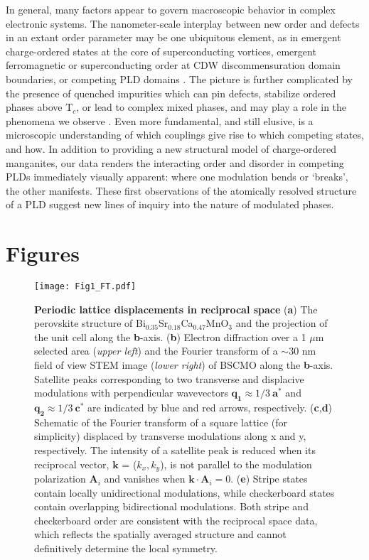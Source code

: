 \documentclass[12pt]{article}
\begin{document}
In general, many factors appear to govern macroscopic behavior in complex electronic systems.
The nanometer-scale interplay between new order and defects in an extant order parameter may be one ubiquitous element, as in emergent charge-ordered states at the core of superconducting vortices, emergent ferromagnetic or superconducting order at CDW discommensuration domain boundaries, or competing PLD domains \cite{Sipos2008,Milward2005,Hoffman2002}.
The picture is further complicated by the presence of quenched impurities which can pin defects, stabilize ordered phases above T$_c$, or lead to complex mixed phases, and may play a role in the phenomena we observe \cite{Dagotto2005,LeTacon2013,Lee1979}.
Even more fundamental, and still elusive, is a microscopic understanding of which couplings give rise to which competing states, and how.
In addition to providing a new structural model of charge-ordered manganites, our data renders the interacting order and disorder in competing PLDs immediately visually apparent: where one modulation bends or `breaks', the other manifests.
These first observations of the atomically resolved structure of a PLD suggest new lines of inquiry into the nature of modulated phases.



\clearpage
\section*{Figures}

\begin{figure}[!htb]
  \texttt{[image: Fig1\_FT.pdf]}
  \caption{\textbf{Periodic lattice displacements in reciprocal space}
(\textbf{a}) The perovskite structure of Bi$_{0.35}$Sr$_{0.18}$Ca$_{0.47}$MnO$_{3}$ and the projection of the unit cell along the \textbf{b}-axis.
(\textbf{b}) Electron diffraction over a 1 $\mu$m selected area (\textit{upper left}) and the Fourier transform of a $\sim$30 nm field of view STEM image (\textit{lower right}) of BSCMO along the \textbf{b}-axis. Satellite peaks corresponding to two transverse and displacive modulations with perpendicular wavevectors $\mathbf{q_{1}} \approx 1/3 \ \mathbf{a^{*}}$  and $\mathbf{q_{2}} \approx 1/3 \ \mathbf{c^{*}}$ are indicated by blue and red arrows, respectively.
(\textbf{c},\textbf{d}) Schematic of the Fourier transform of a square lattice (for simplicity) displaced by transverse modulations along x and y, respectively. 
The intensity of a satellite peak is reduced when its reciprocal vector, $\mathbf{k}$ = ($k_{x},k_{y}$), is not parallel to the modulation polarization $\mathbf{A}_{i}$ and vanishes when $\mathbf{k}\cdot\mathbf{A}_i=0$.
(\textbf{e})  Stripe states contain locally unidirectional modulations, while checkerboard states contain overlapping bidirectional modulations.
Both stripe and checkerboard order are consistent with the reciprocal space data, which reflects the spatially averaged structure and cannot definitively determine the local symmetry.}
  \label{F:FT}
\end{figure}
\end{document}
